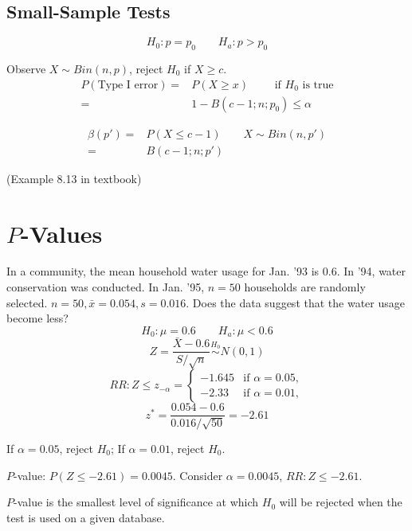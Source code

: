 \subsection{Small-Sample Tests}
\[H_0:p=p_0 \qquad H_a:p>p_0\]

Observe $X \sim Bin(n,p)$, reject $H_0$ if $X\geq c$.
\begin{align*}
P(\text{Type I error})= & P(X \geq x) \qquad \text{ if }H_0 \text{ is true} \\
= & 1- B(c-1;n;p_0) \leq\alpha
\end{align*}

\begin{align*}
\beta(p')= & P(X \leq c-1) \qquad X \sim Bin(n,p') \\
= & B(c-1;n;p')
\end{align*}

\begin{exmp}
(Example 8.13 in textbook)
\end{exmp}

\section{$P$-Values}
\begin{exmp}
In a community, the mean household water usage for Jan. '93 is 0.6. In '94, water conservation was conducted. In Jan. '95, $n=50$ households are randomly selected. $n=50,\bar{x}=0.054,s=0.016$. Does the data suggest that the water usage become less?
\[H_0:\mu=0.6 \qquad H_a:\mu<0.6\]
\[Z=\frac{\bar{X}-0.6}{S/\sqrt{n}}\overset{H_0}{\sim} N(0,1)\]
\[RR: Z\leq z_{-\alpha}=\begin{cases}
-1.645 &\text{if }\alpha=0.05, \\
-2.33 &\text{if }\alpha=0.01, 
\end{cases}\]
\[z^*=\frac{0.054-0.6}{0.016/\sqrt{50}}=-2.61\]

If $\alpha=0.05$, reject $H_0$; If $\alpha=0.01$, reject $H_0$.

$P$-value: $P(Z\leq-2.61)=0.0045$. Consider $\alpha=0.0045$, $RR:Z\leq-2.61$.
\end{exmp}

\begin{defn}
$P$-value is the smallest level of significance at which $H_0$ will be rejected when the test is used on a given database.
\end{defn}

\noindent{}

